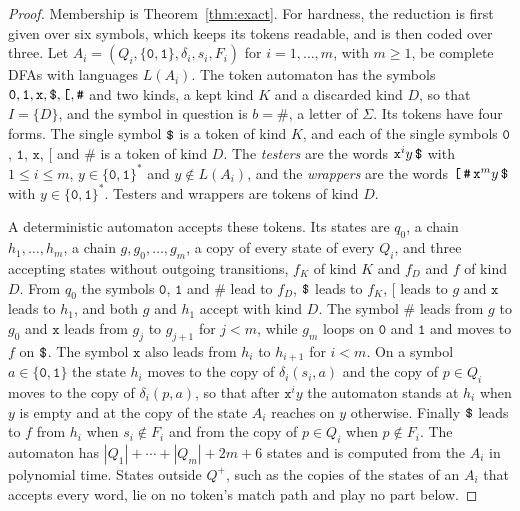 \documentclass[11pt,a4paper]{article}
\theoremstyle{definition}
\theoremstyle{plain}
\newcommand{\code}[1]{\texttt{#1}}
\begin{document}
\begin{proof}
Membership is Theorem~\ref{thm:exact}. For hardness, the reduction is first given over six symbols, which keeps its
tokens readable, and is then coded over three. Let $A_i = (Q_i, \{\code{0}, \code{1}\}, \delta_i, s_i, F_i)$ for
$i = 1, \ldots, m$, with $m \geq 1$, be complete DFAs with languages $L(A_i)$. The token automaton has the symbols
$\code{0}, \code{1}, \code{x}, \code{\symbol{36}}, \code{[}, \code{\#}$ and two kinds, a kept kind $K$ and a discarded
kind $D$, so that $I = \{D\}$, and the symbol in question is $b = \code{\#}$, a letter of $\Sigma$. Its tokens have four
forms. The single symbol $\code{\symbol{36}}$ is a token of kind $K$, and each of the single symbols $\code{0}$,
$\code{1}$, $\code{x}$, $\code{[}$ and $\code{\#}$ is a token of kind $D$. The \emph{testers} are the words
$\code{x}^i y\,\code{\symbol{36}}$ with $1 \leq i \leq m$, $y \in \{\code{0}, \code{1}\}^*$ and $y \notin L(A_i)$, and
the \emph{wrappers} are the words $\code{[}\,\code{\#}\,\code{x}^m y\,\code{\symbol{36}}$ with
$y \in \{\code{0}, \code{1}\}^*$. Testers and wrappers are tokens of kind $D$.

A deterministic automaton accepts these tokens. Its states are $q_0$, a chain $h_1, \ldots, h_m$, a chain
$g, g_0, \ldots, g_m$, a copy of every state of every $Q_i$, and three accepting states without outgoing transitions,
$f_K$ of kind $K$ and $f_D$ and $f$ of kind $D$. From $q_0$ the symbols $\code{0}$, $\code{1}$ and $\code{\#}$ lead to
$f_D$, $\code{\symbol{36}}$ leads to $f_K$, $\code{[}$ leads to $g$ and $\code{x}$ leads to $h_1$, and both $g$ and
$h_1$ accept with kind $D$. The symbol $\code{\#}$ leads from $g$ to $g_0$ and $\code{x}$ leads from $g_j$ to $g_{j+1}$
for $j < m$, while $g_m$ loops on $\code{0}$ and $\code{1}$ and moves to $f$ on $\code{\symbol{36}}$. The symbol
$\code{x}$ also leads from $h_i$ to $h_{i+1}$ for $i < m$. On a symbol $a \in \{\code{0}, \code{1}\}$ the state $h_i$
moves to the copy of $\delta_i(s_i, a)$ and the copy of $p \in Q_i$ moves to the copy of $\delta_i(p, a)$, so that after
$\code{x}^i y$ the automaton stands at $h_i$ when $y$ is empty and at the copy of the state $A_i$ reaches on $y$
otherwise. Finally $\code{\symbol{36}}$ leads to $f$ from $h_i$ when $s_i \notin F_i$ and from the copy of $p \in Q_i$
when $p \notin F_i$. The automaton has $|Q_1| + \cdots + |Q_m| + 2m + 6$ states and is computed from the $A_i$ in
polynomial time. States outside $Q^+$, such as the copies of the states of an $A_i$ that accepts every word, lie on no
token's match path and play no part below.


\end{proof}
\end{document}
